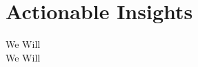 \section*{Actionable Insights}
\begin{Form}
  \CheckBox[name=01]{} We Will\\
  \CheckBox[name=10]{} We Will 
\end{Form}

